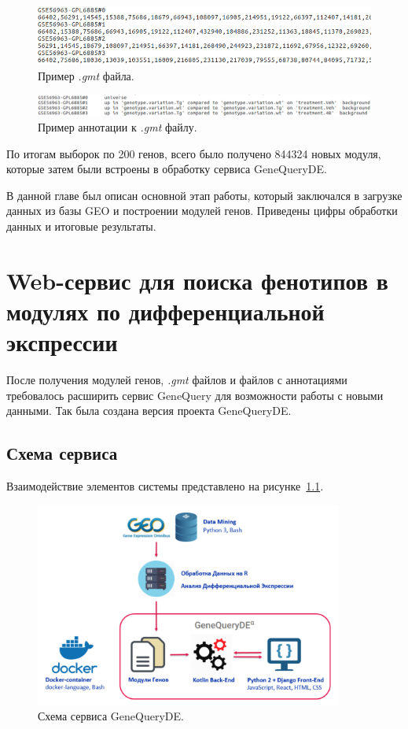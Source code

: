 \documentclass[times,specification,annotation]{itmo-student-thesis}
\begin{document}
\begin{figure}[!h]
    \caption{Пример \textit{.gmt} файла.}\label{gmt}
    \centering
    \includegraphics[width=1\textwidth]{gmt.png}
\end{figure}

\begin{figure}[!h]
    \caption{Пример аннотации к \textit{.gmt} файлу.}\label{annot}
    \centering
    \includegraphics[width=1\textwidth]{gmt_annot.png}
\end{figure}

По итогам выборок по 200 генов, всего было получено 844324 новых модуля, которые затем были встроены в обработку сервиса GeneQueryDE.

\chapterconclusion

В данной главе был описан основной этап работы, который заключался в загрузке данных из базы GEO и построении модулей генов. Приведены цифры обработки данных и итоговые результаты.  


\chapter{Web-сервис для поиска фенотипов в модулях по дифференциальной экспрессии}

После получения модулей генов, \textit{.gmt} файлов и файлов с аннотациями требовалось расширить сервис GeneQuery для возможности работы с новыми данными. Так была создана версия проекта GeneQueryDE. 

\section{Схема сервиса}

Взаимодействие элементов системы представлено на рисунке~\ref{service}. 

\begin{figure}[!h]
    \caption{Схема сервиса GeneQueryDE.}\label{service}
    \centering
    \includegraphics[width=0.9\textwidth]{GeneQueryDE_scheme}
\end{figure}
\end{document}
